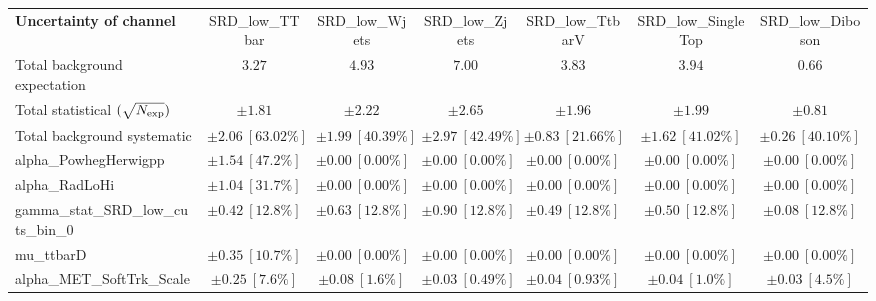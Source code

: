 
\begin{sidewaystable}
\begin{center}
\setlength{\tabcolsep}{0.0pc}
\begin{tabular*}{\textwidth}{@{\extracolsep{\fill}}lcccccc}
\noalign{\smallskip}\hline\noalign{\smallskip}
{\bf Uncertainty of channel}                                    & SRD\_low\_TTbar            & SRD\_low\_Wjets            & SRD\_low\_Zjets            & SRD\_low\_TtbarV            & SRD\_low\_SingleTop            & SRD\_low\_Diboson            \\
\noalign{\smallskip}\hline\noalign{\smallskip}
Total background expectation             &  $3.27$        &  $4.93$        &  $7.00$        &  $3.83$        &  $3.94$        &  $0.66$       \\
\noalign{\smallskip}\hline\noalign{\smallskip}
Total statistical $(\sqrt{N_{\rm exp}})$              & $\pm 1.81$        & $\pm 2.22$        & $\pm 2.65$        & $\pm 1.96$        & $\pm 1.99$        & $\pm 0.81$       \\
Total background systematic               & $\pm 2.06\ [63.02\%] $        & $\pm 1.99\ [40.39\%] $        & $\pm 2.97\ [42.49\%] $        & $\pm 0.83\ [21.66\%] $        & $\pm 1.62\ [41.02\%] $        & $\pm 0.26\ [40.10\%] $             \\
\noalign{\smallskip}\hline\noalign{\smallskip}
\noalign{\smallskip}\hline\noalign{\smallskip}
alpha\_PowhegHerwigpp         & $\pm 1.54\ [47.2\%] $          & $\pm 0.00\ [0.00\%] $          & $\pm 0.00\ [0.00\%] $          & $\pm 0.00\ [0.00\%] $          & $\pm 0.00\ [0.00\%] $          & $\pm 0.00\ [0.00\%] $       \\
alpha\_RadLoHi         & $\pm 1.04\ [31.7\%] $          & $\pm 0.00\ [0.00\%] $          & $\pm 0.00\ [0.00\%] $          & $\pm 0.00\ [0.00\%] $          & $\pm 0.00\ [0.00\%] $          & $\pm 0.00\ [0.00\%] $       \\
gamma\_stat\_SRD\_low\_cuts\_bin\_0         & $\pm 0.42\ [12.8\%] $          & $\pm 0.63\ [12.8\%] $          & $\pm 0.90\ [12.8\%] $          & $\pm 0.49\ [12.8\%] $          & $\pm 0.50\ [12.8\%] $          & $\pm 0.08\ [12.8\%] $       \\
mu\_ttbarD         & $\pm 0.35\ [10.7\%] $          & $\pm 0.00\ [0.00\%] $          & $\pm 0.00\ [0.00\%] $          & $\pm 0.00\ [0.00\%] $          & $\pm 0.00\ [0.00\%] $          & $\pm 0.00\ [0.00\%] $       \\
alpha\_MET\_SoftTrk\_Scale         & $\pm 0.25\ [7.6\%] $          & $\pm 0.08\ [1.6\%] $          & $\pm 0.03\ [0.49\%] $          & $\pm 0.04\ [0.93\%] $          & $\pm 0.04\ [1.0\%] $          & $\pm 0.03\ [4.5\%] $       \\

\end{tabular*}
\end{center}
\end{sidewaystable}
